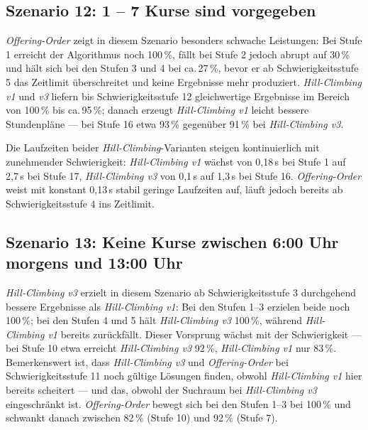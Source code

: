 \newpage


\subsection{Szenario 12: 1 -- 7 Kurse sind vorgegeben}

\textit{Offering-Order} zeigt in diesem Szenario besonders schwache Leistungen: Bei Stufe 1
erreicht der Algorithmus noch 100\,\%, fällt bei Stufe 2 jedoch abrupt auf 30\,\% und hält
sich bei den Stufen 3 und 4 bei ca.\,27\,\%, bevor er ab Schwierigkeitsstufe 5 das Zeitlimit
überschreitet und keine Ergebnisse mehr produziert. \textit{Hill-Climbing v1} und \textit{v3}
liefern bis Schwierigkeitsstufe 12 gleichwertige Ergebnisse im Bereich von 100\,\% bis
ca.\,95\,\%; danach erzeugt \textit{Hill-Climbing v1} leicht bessere Stundenpläne --- bei
Stufe 16 etwa 93\,\% gegenüber 91\,\% bei \textit{Hill-Climbing v3}.

\vspace{1cm}

\newpage

Die Laufzeiten beider \textit{Hill-Climbing}-Varianten steigen kontinuierlich mit zunehmender
Schwierigkeit: \textit{Hill-Climbing v1} wächst von 0{,}18\,s bei Stufe 1 auf 2{,}7\,s bei
Stufe 17, \textit{Hill-Climbing v3} von 0{,}1\,s auf 1{,}3\,s bei Stufe 16.
\textit{Offering-Order} weist mit konstant 0{,}13\,s stabil geringe Laufzeiten auf, läuft
jedoch bereits ab Schwierigkeitsstufe 4 ins Zeitlimit.

\vspace{1cm}

\newpage


\subsection{Szenario 13: Keine Kurse zwischen 6:00 Uhr morgens und 13:00 Uhr}

\textit{Hill-Climbing v3} erzielt in diesem Szenario ab Schwierigkeitsstufe 3 durchgehend
bessere Ergebnisse als \textit{Hill-Climbing v1}: Bei den Stufen 1--3 erzielen beide noch
100\,\%; bei den Stufen 4 und 5 hält \textit{Hill-Climbing v3} 100\,\%, während
\textit{Hill-Climbing v1} bereits zurückfällt. Dieser Vorsprung wächst mit der Schwierigkeit
--- bei Stufe 10 etwa erreicht \textit{Hill-Climbing v3} 92\,\%, \textit{Hill-Climbing v1}
nur 83\,\%. Bemerkenswert ist, dass \textit{Hill-Climbing v3} und \textit{Offering-Order} bei
Schwierigkeitsstufe 11 noch gültige Lösungen finden, obwohl \textit{Hill-Climbing v1} hier
bereits scheitert --- und das, obwohl der Suchraum bei \textit{Hill-Climbing v3} eingeschränkt
ist. \textit{Offering-Order} bewegt sich bei den Stufen 1--3 bei 100\,\% und schwankt danach
zwischen 82\,\% (Stufe 10) und 92\,\% (Stufe 7).

